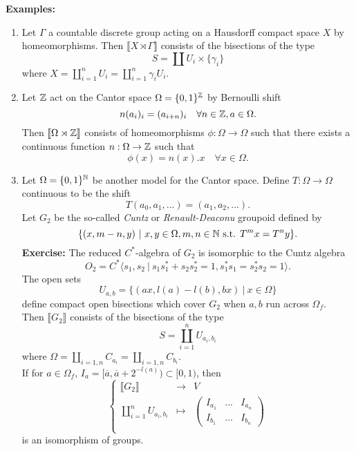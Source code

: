 \textbf{Examples:}
\begin{enumerate}
\item Let $\Gamma$ a countable discrete group acting on a Hausdorff compact space $X$ by homeomorphisms. Then $\llbracket X\rtimes \Gamma \rrbracket$ consists of the bisections of the type \[S=\coprod U_i\times \{\gamma_i\}\]
where $X = \coprod_{i=1}^n U_i = \coprod_{i=1}^n \gamma_i U_i$.\\
\item Let $\mathbb Z$ act on the Cantor space $\Omega= \{0,1\}^\mathbb Z$ by Bernoulli shift
\[ n (a_i)_i = (a_{i+n})_i\quad \forall n\in \mathbb Z , a \in \Omega.\]
Then $\llbracket \Omega\rtimes \mathbb Z \rrbracket$ consists of homeomorphisms $\phi : \Omega \rightarrow \Omega$ such that there exists a continuous function $n: \Omega \rightarrow \mathbb Z$ such that 
\[\phi(x) = n(x).x\quad \forall x\in \Omega.\]
\item Let $\Omega= \{0,1\}^\mathbb N$ be another model for the Cantor space. Define $T: \Omega \rightarrow \Omega$ continuous to be the shift
\[T(a_0, a_1,...)= (a_1,a_2,...).\]
Let $G_2$ be the so-called \textit{Cuntz} or \textit{Renault-Deaconu} groupoid defined by
\[\{(x,m-n,y)\ | \ x,y\in \Omega , m,n\in \mathbb N \text{ s.t. } T^mx= T^ny \}.\]
\textbf{Exercise:} The reduced $C^*$-algebra of $G_2$ is isomorphic to the Cuntz algebra
\[O_2 = C^* \langle s_1,s_2 \ | \ s_1 s_1^* + s_2 s_2^* =1 , s_1^*s_1 = s_2^*s_2 =1\rangle .\]
The open sets  
\[U_{a,b} = \{(ax,l(a)-l(b),bx)\ | \ x\in \Omega\}\]
define compact open bisections which cover $G_2$ when $a,b$ run across $\Omega_f$. \\

Then $\llbracket G_2 \rrbracket$ consists of the bisections of the type
\[S = \coprod_{i=1}^n U_{a_i,b_i}\]
where $\Omega = \coprod_{i=1,n} C_{a_i} = \coprod_{i=1,n} C_{b_i}$.\\

If for $a\in \Omega_f$, $I_a= [\overline a, \overline a + 2^{-l(a)})\subset [0,1)$, then 
\[\left\{\begin{array}{rcl}
\llbracket G_2 \rrbracket & \rightarrow & V \\
\coprod_{i=1}^n U_{a_i,b_i} & \mapsto & \begin{pmatrix} I_{a_1} & ... & I_{a_n} \\  I_{b	_1} & ... & I_{b_n} \end{pmatrix} \\
\end{array}\right.\]
is an isomorphism of groups.
\end{enumerate}

